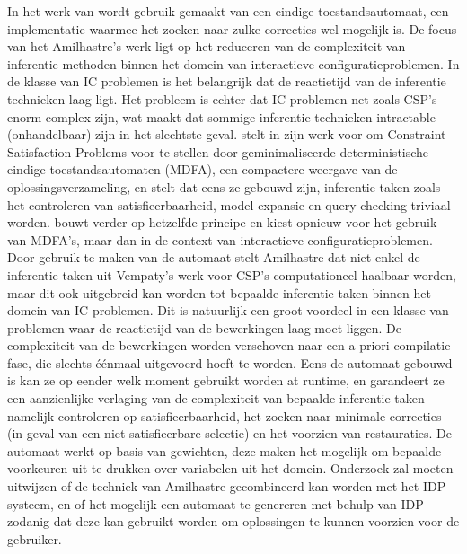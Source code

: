 In het werk van \citet{amilhastre2002consistency} wordt gebruik gemaakt van een eindige toestandsautomaat, een implementatie waarmee het zoeken naar zulke correcties wel mogelijk is. De focus van het Amilhastre's werk ligt op het reduceren van de complexiteit van inferentie methoden binnen het domein van interactieve configuratieproblemen. In de klasse van IC problemen is het belangrijk dat de reactietijd van de inferentie technieken laag ligt. Het probleem is echter dat IC problemen net zoals CSP's enorm complex zijn, wat maakt dat sommige inferentie technieken intractable (onhandelbaar) zijn in het slechtste geval. \citet{vempaty1992solving} stelt in zijn werk voor om Constraint Satisfaction Problems voor te stellen door geminimaliseerde deterministische eindige toestandsautomaten (MDFA), een compactere weergave van de oplossingsverzameling, en stelt dat eens ze gebouwd zijn, inferentie taken zoals het controleren van satisfieerbaarheid, model expansie en query checking triviaal worden. \citet{amilhastre2002consistency} bouwt verder op hetzelfde principe en kiest opnieuw voor het gebruik van MDFA's, maar dan in de context van interactieve configuratieproblemen. Door gebruik te maken van de automaat stelt Amilhastre dat niet enkel de inferentie taken uit Vempaty's werk voor CSP's computationeel haalbaar worden, maar dit ook uitgebreid kan worden tot bepaalde inferentie taken binnen het domein van IC problemen. Dit is natuurlijk een groot voordeel in een klasse van problemen waar de reactietijd van de bewerkingen laag moet liggen. De complexiteit van de bewerkingen worden verschoven naar een a priori compilatie fase, die slechts \'{e}\'{e}nmaal uitgevoerd hoeft te worden. Eens de automaat gebouwd is kan ze op eender welk moment gebruikt worden at runtime, en garandeert ze een aanzienlijke verlaging van de complexiteit van bepaalde inferentie taken namelijk controleren op satisfieerbaarheid, het zoeken naar minimale correcties (in geval van een niet-satisfieerbare selectie) en het voorzien van restauraties. De automaat werkt op basis van gewichten, deze maken het mogelijk om bepaalde voorkeuren uit te drukken over variabelen uit het domein. Onderzoek zal moeten uitwijzen of de techniek van Amilhastre gecombineerd kan worden met het IDP systeem, en of het mogelijk een automaat te genereren met behulp van IDP zodanig dat deze kan gebruikt worden om oplossingen te kunnen voorzien voor de gebruiker.

